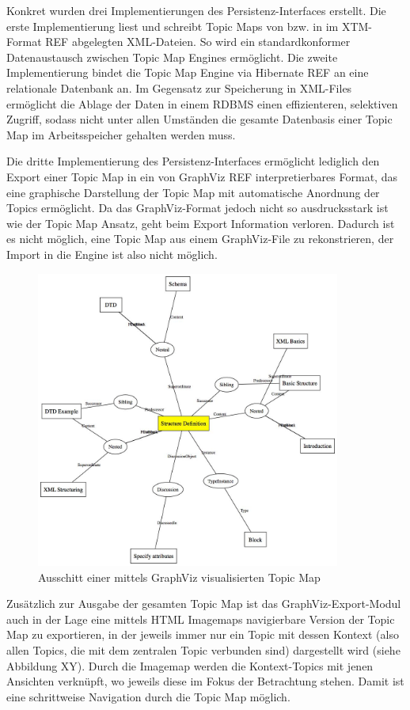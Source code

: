 Konkret wurden drei Implementierungen des Persistenz-Interfaces erstellt. Die erste Implementierung liest und schreibt Topic Maps von bzw. in im \gls{XTM}-Format REF abgelegten \gls{XML}-Dateien. So wird ein standardkonformer Datenaustausch zwischen Topic Map Engines ermöglicht. Die zweite Implementierung bindet die Topic Map Engine via Hibernate REF an eine relationale Datenbank an. Im Gegensatz zur Speicherung in XML-Files ermöglicht die Ablage der Daten in einem RDBMS einen effizienteren, selektiven Zugriff, sodass nicht unter allen Umständen die gesamte Datenbasis einer Topic Map im Arbeitsspeicher gehalten werden muss.

Die dritte Implementierung des Persistenz-Interfaces ermöglicht lediglich den Export einer Topic Map in ein von GraphViz REF interpretierbares Format, das eine graphische Darstellung der Topic Map mit automatische Anordnung der Topics ermöglicht. Da das GraphViz-Format jedoch nicht so ausdrucksstark ist wie der Topic Map Ansatz, geht beim Export Information verloren. Dadurch ist es nicht möglich, eine Topic Map aus einem GraphViz-File zu rekonstrieren, der Import in die Engine ist also nicht möglich. 

\begin{figure}[htbp]
	\centering
		\includegraphics[width=10cm]{img/Persistenz/GraphVizExample.jpg}
	\caption{Ausschitt einer mittels GraphViz visualisierten Topic Map}
	\label{fig:img_Persistenz_GraphViz}
\end{figure}
Zusätzlich zur Ausgabe der gesamten Topic Map ist das GraphViz-Export-Modul auch in der Lage eine mittels HTML Imagemaps navigierbare Version der Topic Map zu exportieren, in der jeweils immer nur ein Topic mit dessen Kontext (also allen Topics, die mit dem zentralen Topic verbunden sind) dargestellt wird (siehe Abbildung XY). Durch die Imagemap werden die Kontext-Topics mit jenen Ansichten verknüpft, wo jeweils diese im Fokus der Betrachtung stehen. Damit ist eine schrittweise Navigation durch die Topic Map möglich.

